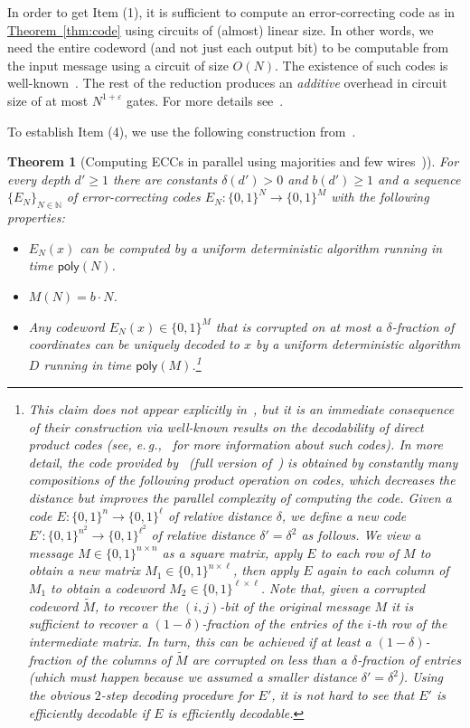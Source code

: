 \documentclass[11pt]{article}
\numberwithin{equation}{section}
\newtheorem{theorem}{Theorem}[section]
\theoremstyle{definition}
\theoremstyle{plain}
\newcommand{\eg}{e.\,g.}
\newcommand{\expref}[2]{\hyperref[#2]{#1~\ref{#2}}}
\begin{document}
In order to get Item (1), it is sufficient to compute an error-correcting code as in \expref{Theorem}{thm:code} using circuits of (almost) linear size. In other words, we need the entire codeword (and not just each output bit) to be computable from the input message using a circuit of size $O(N)$. The existence of such codes is well-known~\cite{DBLP:journals/tit/SipserS96, DBLP:journals/tit/Spielman96}. The rest of the reduction produces an \emph{additive} overhead in circuit size of at most $N^{1 + \varepsilon}$ gates. For more details see~\cite{OS18}.

To establish Item (4), we use the following construction from~\cite{RoeiTell18}.

\begin{theorem}[Computing ECCs in parallel using majorities and few wires~\cite{RoeiTell18})] \label{thm:code2} For every depth $d' \geq 1$ there are constants $\delta(d') > 0$ and $b(d') \geq 1$ and a sequence $\{E_N\}_{N \in \mathbb{N}}$ of error-correcting codes $E_N \colon \{0,1\}^N \to \{0,1\}^{M}$ with the following properties:
\vspace{0.2cm}
\begin{itemize}
\item $E_N(x)$ can be computed by a uniform deterministic algorithm running in time $\mathsf{poly}(N)$.
\item $M(N) = b \cdot N$.
\item Any codeword $E_N(x) \in \{0,1\}^{M}$ that is corrupted on at most a $\delta$-fraction of coordinates can be uniquely decoded to $x$ by a uniform deterministic algorithm $D$ running in time $\mathsf{poly}(M)$.\footnote{This claim does not appear explicitly in~\cite{RoeiTell18}, but it is an immediate consequence of their construction via well-known results on the decodability of direct product codes (see, \eg,~\cite{macwilliams1977theory} for more information about such codes). In more detail, the code provided by~\cite[Proposition 6.5]{DBLP:journals/eccc/Tell17} (full version of~\cite{RoeiTell18}) is obtained by constantly many compositions of the following product operation on codes, which decreases the distance but improves the parallel complexity of computing the code. Given a code $E \colon \{0,1\}^{n} \to \{0,1\}^{\ell}$ of relative distance $\delta$, we define a new code $E' \colon \{0,1\}^{n^2} \to \{0,1\}^{\ell^2}$ of relative distance $\delta' = \delta^2$ as follows. We view a message $M \in \{0,1\}^{n \times n}$ as a square matrix, apply $E$ to each row of $M$ to obtain a new matrix $M_1 \in \{0,1\}^{n \times \ell}$, then apply $E$ again to each column of $M_1$ to obtain a codeword $M_2 \in \{0,1\}^{\ell \times \ell}$. Note that, given a corrupted codeword $\widetilde{M}$, to recover the $(i,j)$-bit of the original message $M$ it is sufficient to recover a $(1 - \delta)$-fraction of the entries of the $i$-th row of the intermediate matrix. In turn, this can be achieved if at least a $(1 - \delta)$-fraction of the columns of $\widetilde{M}$ are corrupted on less than a $\delta$-fraction of entries (which must happen because we assumed a smaller distance $\delta' = \delta^2$). Using the obvious $2$-step decoding procedure for $E'$, it is not hard to see that $E'$ is efficiently decodable if $E$ is efficiently decodable.}

\end{itemize}
\end{theorem}
\end{document}
